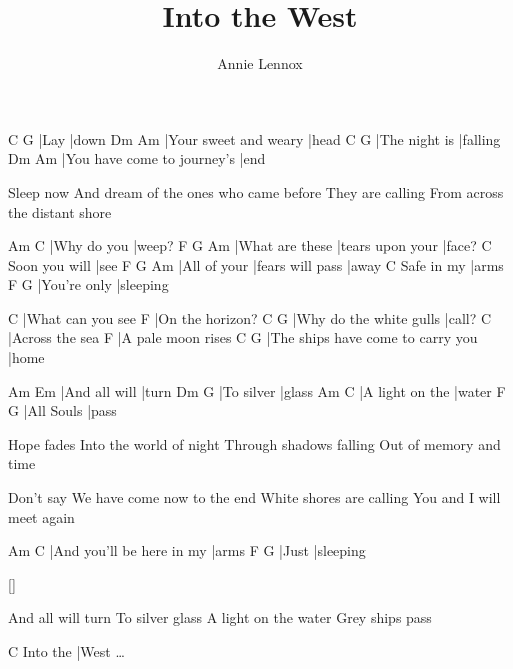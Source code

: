 \documentclass{song}
\title{Into the West}
\author{Annie Lennox}
\begin{document}
\begin{multicols}{2}

\strophe
C    G
|Lay |down
Dm                    Am
|Your sweet and weary |head
C             G
|The night is |falling
Dm                          Am
|You have come to journey's |end
\endstrophe

\strophe*
Sleep now
And dream of the ones who came before
They are calling
From across the distant shore
\endstrophe

\strophe
Am          C
|Why do you |weep?
F               G                Am
|What are these |tears upon your |face?
              C
Soon you will |see
F            G                Am
|All of your |fears will pass |away
           C
Safe in my |arms
F            G
|You're only |sleeping
\endstrophe

C
|What can you see
F
|On the horizon?
C                       G
|Why do the white gulls |call?
C
|Across the sea
F
|A pale moon rises
C                                 G
|The ships have come to carry you |home
\endstrophe

\varrefrain
Am            Em
|And all will |turn
Dm         G
|To silver |glass
Am              C
|A light on the |water
F          G
|All Souls |pass
\endstrophe

\columnbreak

\strophe*
Hope fades
Into the world of night
Through shadows falling
Out of memory and time
\endstrophe

\strophe*
Don't say
We have come now to the end
White shores are calling
You and I will meet again
\endstrophe

\strophe
Am                        C
|And you'll be here in my |arms
F     G
|Just |sleeping
\endstrophe

\ref{}

\varrefrain*
And all will turn
To silver glass
A light on the water
Grey ships pass
\endstrophe

\strophe
         C
Into the |West \ldots
\endstrophe

\end{multicols}
\end{document}
